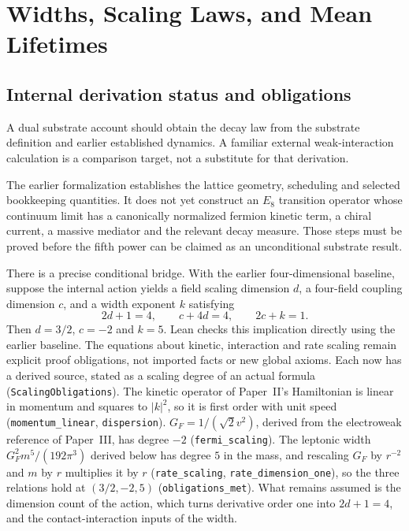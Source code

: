 \section{Widths, Scaling Laws, and Mean Lifetimes}
\label{sec:particle_decay}
\subsection{Internal derivation status and obligations}
A dual substrate account should obtain the decay law from the substrate definition and earlier established dynamics. A familiar external weak-interaction calculation is a comparison target, not a substitute for that derivation.

The earlier formalization establishes the lattice geometry, scheduling and selected bookkeeping quantities. It does not yet construct an $E_8$ transition operator whose continuum limit has a canonically normalized fermion kinetic term, a chiral current, a massive mediator and the relevant decay measure. Those steps must be proved before the fifth power can be claimed as an unconditional substrate result.

There is a precise conditional bridge. With the earlier four-dimensional baseline, suppose the internal action yields a field scaling dimension $d$, a four-field coupling dimension $c$, and a width exponent $k$ satisfying
\begin{equation}
2d+1=4,\qquad c+4d=4,\qquad 2c+k=1.
\end{equation}
Then $d=3/2$, $c=-2$ and $k=5$. Lean checks this implication directly using the earlier baseline. The equations about kinetic, interaction and rate scaling remain explicit proof obligations, not imported facts or new global axioms. Each now has a derived source, stated as a scaling degree of an actual formula (\texttt{ScalingObligations}). The kinetic operator of Paper~II's Hamiltonian is linear in momentum and squares to $|k|^2$, so it is first order with unit speed (\texttt{momentum\_linear}, \texttt{dispersion}). $G_F=1/(\sqrt2v^2)$, derived from the electroweak reference of Paper~III, has degree $-2$ (\texttt{fermi\_scaling}). The leptonic width $G_F^2m^5/(192\pi^3)$ derived below has degree $5$ in the mass, and rescaling $G_F$ by $r^{-2}$ and $m$ by $r$ multiplies it by $r$ (\texttt{rate\_scaling}, \texttt{rate\_dimension\_one}), so the three relations hold at $(3/2,-2,5)$ (\texttt{obligations\_met}). What remains assumed is the dimension count of the action, which turns derivative order one into $2d+1=4$, and the contact-interaction inputs of the width.

